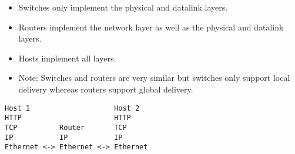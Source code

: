 \documentclass[]{article}
\providecommand{\tightlist}{%
  \setlength{\itemsep}{0pt}\setlength{\parskip}{0pt}}
\begin{document}
\begin{itemize}
\begin{verbatim}
[TCP Header | [HTTP Header | HTTP Payload]]
\end{verbatim}

  \begin{itemize}
  \tightlist
  \item
    Network layer wraps TCP request in IP Payload
  \end{itemize}

\begin{verbatim}
[IP Header | [TCP Header | [HTTP Header | HTTP Payload]]]
\end{verbatim}

  \begin{itemize}
  \tightlist
  \item
    Data link layer wraps IP request in Ethernet payload.
  \end{itemize}

\begin{verbatim}
[Ethernet Header | [IP Header | [TCP Header | [HTTP Header | HTTP Payload]]]]
\end{verbatim}

  \begin{itemize}
  \tightlist
  \item
    This data is sent over the physical link and reversed up the stack.
  \end{itemize}
\item
  Switches only implement the physical and datalink layers.
\item
  Routers implement the network layer as well as the physical and
  datalink layers.
\item
  Hosts implement all layers.
\item
  Note: Switches and routers are very similar but switches only support
  local delivery whereas routers support global delivery.
\end{itemize}

\begin{verbatim}
Host 1                    Host 2      
HTTP                      HTTP
TCP          Router       TCP
IP           IP           IP
Ethernet <-> Ethernet <-> Ethernet
\end{verbatim}
\end{document}
